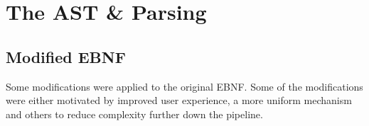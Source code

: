 \section{The AST \& Parsing}

\subsection{Modified EBNF}

\setlength{\grammarparsep}{8pt plus 1pt minus 1pt} %
\setlength{\grammarindent}{10em} %

Some modifications were applied to the original EBNF. Some of
the modifications were either motivated by improved user
experience, a more uniform mechanism and others to reduce
complexity further down the pipeline.

